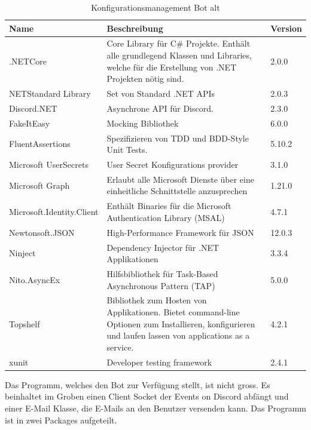 \documentclass[a4paper, table]{article}
\begin{document}
\begin{table}[h]
    \centering
    \begin{tabular}{|l|p{20em}|l|}
        \hline
        \rowcolor[gray]{.9} Name & Beschreibung & Version \\
        \hline
        .NETCore & Core Library für C\# Projekte.
        Enthält alle grundlegend Klassen und Libraries, welche für die Erstellung von .NET Projekten nötig sind. & 2.0.0 \\
        \hline
        NETStandard Library & Set von Standard .NET APIs & 2.0.3 \\
        \hline
        Discord.NET & Asynchrone API für Discord. & 2.3.0 \\
        \hline
        FakeItEasy & Mocking Bibliothek & 6.0.0 \\
        \hline
        FluentAssertions & Spezifizieren von TDD und BDD-Style Unit Tests. & 5.10.2 \\
        \hline
        Microsoft UserSecrets & User Secret Konfigurations provider & 3.1.0 \\
        \hline
        Microsoft Graph & Erlaubt alle Microsoft Dienste über eine einheitliche Schnittstelle anzusprechen & 1.21.0 \\
        \hline
        Microsoft.Identity.Client & Enthält Binaries für die Microsoft Authentication Library (MSAL) & 4.7.1 \\
        \hline
        Newtonsoft.JSON & High-Performance Framework für JSON & 12.0.3 \\
        \hline
        Ninject & Dependency Injector für .NET Applikationen & 3.3.4 \\
        \hline
        Nito.AsyncEx & Hilfsbibliothek für Task-Based Asynchronous Pattern (TAP) & 5.0.0 \\
        \hline
        Topshelf & Bibliothek zum Hosten von Applikationen. 
        Bietet command-line Optionen zum Installieren, konfigurieren und laufen lassen von applications as a service. & 4.2.1 \\
        \hline
        xunit & Developer testing framework & 2.4.1 \\
        \hline
    \end{tabular}
    \caption{Konfigurationsmanagement Bot alt}
    \label{tab: Konfigurationsmanagement-Bot-alt}
\end{table}


Das Programm, welches den Bot zur Verfügung stellt, ist nicht gross. Es beinhaltet im Groben einen Client Socket der
Events on Discord abfängt und einer E-Mail Klasse, die E-Mails an den Benutzer versenden kann.
Das Programm ist in zwei Packages aufgeteilt.
\end{document}
